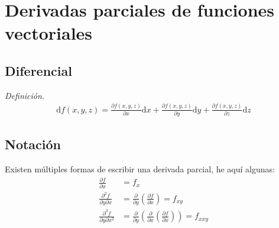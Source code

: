 \documentclass[12pt,openany]{book}
\begin{document}
	\section{Derivadas parciales de funciones vectoriales}

		\subsection{Diferencial}
		\textsl{Definici\'on.}
		\begin{equation*}
			\begin{split}
				\mathrm{d}f(x,y,z)=\frac{\partial f(x,y,z)}{\partial x}\mathrm{d}x+\frac{\partial f(x,y,z)}{\partial y}\mathrm{d}y
								  +\frac{\partial f(x,y,z)}{\partial z}\mathrm{d}z
			\end{split}
		\end{equation*}

		\subsection{Notaci\'on}
		Existen m\'ultiples formas de escribir una derivada parcial, he aqu\'i algunas:
			\begin{equation*}
				\begin{split}
					\frac{\partial f}{\partial x}&=f_{x}		\\
					\frac{\partial^{2} f}{\partial y \partial x}&=\frac{\partial}{\partial y }\left(\frac{\partial f}{\partial x}\right)
														=f_{xy}	\\
					\frac{\partial^{3} f}{\partial y \partial x^{2}}&=\frac{\partial}{\partial y}
																	 \left(\frac{\partial }{\partial x}
																	 \left(\frac{\partial f}{\partial x}\right)
																	 \right)=f_{xxy}
				\end{split}
			\end{equation*}

\end{document}
